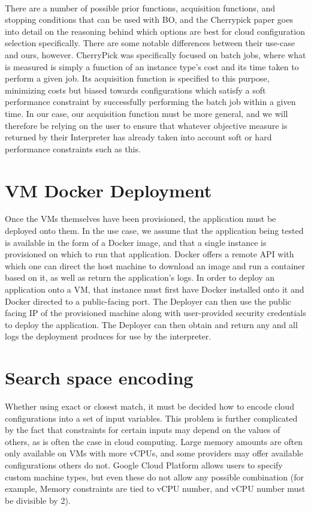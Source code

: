 \documentclass{report}
\begin{document}
\paragraph{}
There are a number of possible prior functions, acquisition functions, and stopping conditions that can be used with BO, and the Cherrypick paper goes into detail on the reasoning behind which options are best for cloud configuration selection specifically\cite{Alipourfard2017}. There are some notable differences between their use-case and ours, however. CherryPick was specifically focused on batch jobs, where what is measured is simply a function of an instance type's cost and its time taken to perform a given job. Its acquisition function is specified to this purpose, minimizing costs but biased towards configurations which satisfy a soft performance constraint by successfully performing the batch job within a given time. In our case, our acquisition function must be more general, and we will therefore be relying on the user to ensure that whatever objective measure is returned by their Interpreter has already taken into account soft or hard performance constraints such as this.
\section{VM Docker Deployment}
Once the VMs themselves have been provisioned, the application must be deployed onto them. In the use case, we assume that the application being tested is available in the form of a Docker image, and that a single instance is provisioned on which to run that application. Docker offers a remote API with which one can direct the host machine to download an image and run a container based on it, as well as return the application's logs. In order to deploy an application onto a VM, that instance must first have Docker installed onto it and Docker directed to a public-facing port. The Deployer can then use the public facing IP of the provisioned machine along with user-provided security credentials to deploy the application. The Deployer can then obtain and return any and all logs the deployment produces for use by the interpreter.

\section{Search space encoding}
Whether using exact or closest match, it must be decided how to encode cloud configurations into a set of input variables. This problem is further complicated by the fact that constraints for certain inputs may depend on the values of others, as is often the case in cloud computing. Large memory amounts are often only available on VMs with more vCPUs, and some providers may offer available configurations others do not. Google Cloud Platform allows users to specify custom machine types, but even these do not allow any possible combination (for example, Memory constraints are tied to vCPU number, and vCPU number must be divisible by 2).
\end{document}
